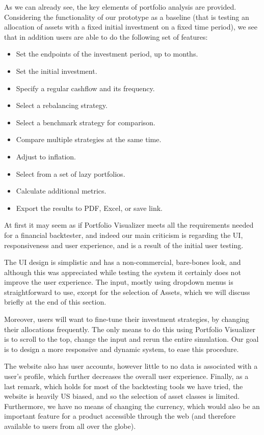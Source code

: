 \documentclass[main.tex]{subfiles}
\begin{document}
As we can already see, the key elements of portfolio analysis are provided. Considering the functionality of our prototype as a baseline (that is testing an allocation of assets with a fixed initial investment on a fixed time period), we see that in addition users are able to do the following set of features:

\begin{itemize}
  \item Set the endpoints of the investment period, up to months.
  \item Set the initial investment. 
  \item Specify a regular cashflow and its frequency.
  \item Select a rebalancing strategy.
  \item Select a benchmark strategy for comparison.
  \item Compare multiple strategies at the same time.
  \item Adjust to inflation.
  \item Select from a set of lazy portfolios.
  \item Calculate additional metrics. 
  \item Export the results to PDF, Excel, or save link. 
\end{itemize}

At first it may seem as if Portfolio Visualizer meets all the requirements needed for a financial backtester, and indeed our main criticism is regarding the UI, responsiveness and user experience, and is a result of the initial user testing. 

The UI design is simplistic and has a non-commercial, bare-bones look, and although this was appreciated while testing the system it certainly does not improve the user experience. The input, mostly using dropdown menus is straightforward to use, except for the selection of Assets, which we will discuss briefly at the end of this section.

Moreover, users will want to fine-tune their investment strategies, by changing their allocations frequently. The only means to do this using Portfolio Visualizer is to scroll to the top, change the input and rerun the entire simulation. Our goal is to design a more responsive and dynamic system, to ease this procedure. 

The website also has user accounts, however little to no data is associated with a user's profile, which further decreases the overall user experience. Finally, as a last remark, which holds for most of the backtesting tools we have tried, the website is heavily US biased, and so the selection of asset classes is limited. Furthermore, we have no means of changing the currency, which would also be an important feature for a product accessible through the web (and therefore available to users from all over the globe).
\end{document}
